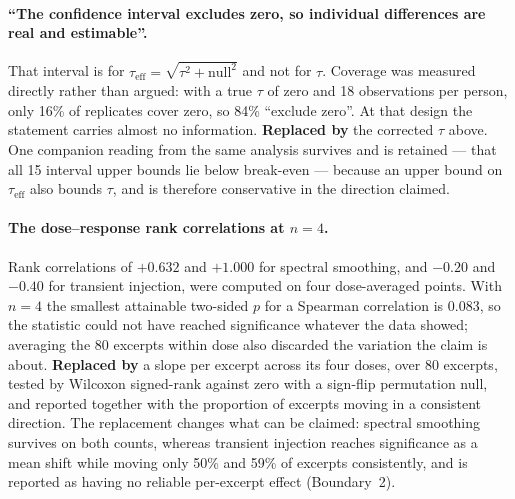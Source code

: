 \paragraph{``The confidence interval excludes zero, so individual differences are real
and estimable''.}
That interval is for $\tau_{\mathrm{eff}} = \sqrt{\tau^2 + \mathrm{null}^2}$ and not
for $\tau$. Coverage was measured directly rather than argued: with a true $\tau$ of
zero and 18 observations per person, only 16\% of replicates cover zero, so 84\%
``exclude zero''. At that design the statement carries almost no information.
\textbf{Replaced by} the corrected $\tau$ above. One companion reading from the same
analysis survives and is retained --- that all 15 interval upper bounds lie below
break-even --- because an upper bound on $\tau_{\mathrm{eff}}$ also bounds $\tau$, and
is therefore conservative in the direction claimed.

\paragraph{The dose--response rank correlations at $n = 4$.}
Rank correlations of $+0.632$ and $+1.000$ for spectral smoothing, and $-0.20$ and
$-0.40$ for transient injection, were computed on four dose-averaged points. With
$n = 4$ the smallest attainable two-sided $p$ for a Spearman correlation is $0.083$, so
the statistic could not have reached significance whatever the data showed; averaging
the 80 excerpts within dose also discarded the variation the claim is about.
\textbf{Replaced by} a slope per excerpt across its four doses, over 80 excerpts, tested
by Wilcoxon signed-rank against zero with a sign-flip permutation null, and reported
together with the proportion of excerpts moving in a consistent direction. The
replacement changes what can be claimed: spectral smoothing survives on both counts,
whereas transient injection reaches significance as a mean shift while moving only 50\%
and 59\% of excerpts consistently, and is reported as having no reliable per-excerpt
effect (Boundary~2).

